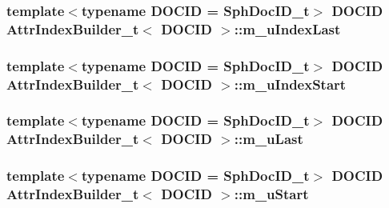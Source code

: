 \hypertarget{classAttrIndexBuilder__t_a3032185497a931732aed32d2a4f4b3f7}{
\subsubsection[{m\-\_\-u\-Index\-Last}]{\setlength{\rightskip}{0pt plus 5cm}template$<$typename D\-O\-C\-I\-D  = Sph\-Doc\-I\-D\-\_\-t$>$ D\-O\-C\-I\-D {\bf Attr\-Index\-Builder\-\_\-t}$<$ D\-O\-C\-I\-D $>$\-::m\-\_\-u\-Index\-Last\hspace{0.3cm}{\ttfamily [private]}}}\label{classAttrIndexBuilder__t_a3032185497a931732aed32d2a4f4b3f7}
\hypertarget{classAttrIndexBuilder__t_a272b2558b849ba268d2d723f489c600b}{
\subsubsection[{m\-\_\-u\-Index\-Start}]{\setlength{\rightskip}{0pt plus 5cm}template$<$typename D\-O\-C\-I\-D  = Sph\-Doc\-I\-D\-\_\-t$>$ D\-O\-C\-I\-D {\bf Attr\-Index\-Builder\-\_\-t}$<$ D\-O\-C\-I\-D $>$\-::m\-\_\-u\-Index\-Start\hspace{0.3cm}{\ttfamily [private]}}}\label{classAttrIndexBuilder__t_a272b2558b849ba268d2d723f489c600b}
\hypertarget{classAttrIndexBuilder__t_a7f8c31acecb690d097e8e929d24428c3}{
\subsubsection[{m\-\_\-u\-Last}]{\setlength{\rightskip}{0pt plus 5cm}template$<$typename D\-O\-C\-I\-D  = Sph\-Doc\-I\-D\-\_\-t$>$ D\-O\-C\-I\-D {\bf Attr\-Index\-Builder\-\_\-t}$<$ D\-O\-C\-I\-D $>$\-::m\-\_\-u\-Last\hspace{0.3cm}{\ttfamily [private]}}}\label{classAttrIndexBuilder__t_a7f8c31acecb690d097e8e929d24428c3}
\hypertarget{classAttrIndexBuilder__t_ad19cc055d67fa5dbcd64300b8dd54df0}{
\subsubsection[{m\-\_\-u\-Start}]{\setlength{\rightskip}{0pt plus 5cm}template$<$typename D\-O\-C\-I\-D  = Sph\-Doc\-I\-D\-\_\-t$>$ D\-O\-C\-I\-D {\bf Attr\-Index\-Builder\-\_\-t}$<$ D\-O\-C\-I\-D $>$\-::m\-\_\-u\-Start\hspace{0.3cm}{\ttfamily [private]}}}\label{classAttrIndexBuilder__t_ad19cc055d67fa5dbcd64300b8dd54df0}
